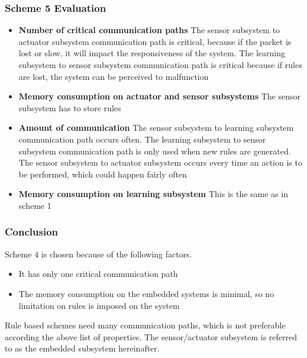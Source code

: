 \subsubsection{Scheme 5 Evaluation}
\begin{itemize}
\item \textbf{Number of critical communication paths} The sensor subsystem to actuator subsystem communication path is critical, because if the packet is lost or slow, it will impact the responsiveness of the system. The learning subsystem to sensor subsystem communication path is critical because if rules are lost, the system can be perceived to malfunction
\item \textbf{Memory consumption on actuator and sensor subsystems} The sensor subsystem has to store rules
\item \textbf{Amount of communication} The sensor subsystem to learning subsystem communication path occurs often. The learning subsystem to sensor subsystem communication path is only used when new rules are generated. The sensor subsystem to actuator subsystem occurs every time an action is to be performed, which could happen fairly often
\item \textbf{Memory consumption on learning subsystem} This is the same as in scheme 1
\end{itemize}

\subsubsection{Conclusion}
Scheme 4 is chosen because of the following factors.
\begin{itemize}
\item It has only one critical communication path
\item The memory consumption on the embedded systems is minimal, so no limitation on rules is imposed on the system
\end{itemize}

Rule based schemes need many communication paths, which is not preferable according the above list of properties. The sensor/actuator subsystem is referred to as the embedded subsystem hereinafter.
